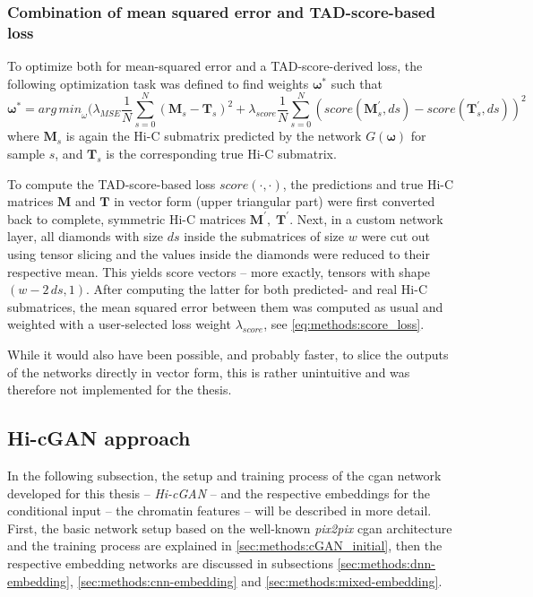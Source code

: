 \subsubsection{Combination of mean squared error and TAD-score-based loss} \label{sec:methods:score_loss}
To optimize both for mean-squared error and a TAD-score-derived loss, the following optimization task was defined to find weights $\bm{\omega}^*$ such that
\begin{equation}
 \bm{\omega}^* = \mathit{arg\,min}_\omega (  \lambda_\mathit{MSE} \frac{1}{N} \sum_{s=0}^N (\mathbf{M}_s - \mathbf{T}_s)^2
                                                    + \lambda_\mathit{score} \frac{1}{N} \sum_{s=0}^N (\mathit{score}(\mathbf{M}^\prime_s,ds) - \mathit{score}(\mathbf{T}^\prime_s,ds))^2 \label{eq:methods:score_loss}
\end{equation}
where $\mathbf{M}_s$ is again the Hi-C submatrix predicted by the network $G(\bm{\omega})$ for sample $s$, and $\mathbf{T}_s$ is the corresponding true Hi-C submatrix.

To compute the TAD-score-based loss $\mathit{score}(\cdot,\cdot)$, the predictions and true Hi-C matrices $\mathbf{M}$ and $\mathbf{T}$ in vector form (upper triangular part)
were first converted back to complete, symmetric Hi-C matrices $\mathbf{M}^\prime,\; \mathbf{T}^\prime$. 
Next, in a custom network layer, all diamonds with size $ds$ inside the submatrices of size $w$ were cut out using tensor slicing and the values inside the diamonds were reduced to their respective mean.
This yields score vectors -- more exactly, tensors with shape $(w - 2\,ds, 1)$.
After computing the latter for both predicted- and real Hi-C submatrices, the mean squared error between them was computed as usual and weighted with 
a user-selected loss weight $\lambda_\mathit{score}$, see \cref{eq:methods:score_loss}.

While it would also have been possible, and probably faster, to slice the outputs of the networks directly in vector form, 
this is rather unintuitive and was therefore not implemented for the thesis. 

\subsection{Hi-cGAN approach} \label{sec:methods:hicgan}
In the following subsection, the setup and training process of the \acrshort{cgan} network developed for this thesis -- \emph{Hi-cGAN} -- and the respective
embeddings for the conditional input -- the chromatin features -- will be described in more detail.
First, the basic network setup based on the well-known \emph{pix2pix} \acrshort{cgan} architecture \cite{Isola2017} and the training process
are explained in \cref{sec:methods:cGAN_initial}, then the respective embedding networks are discussed in subsections \ref{sec:methods:dnn-embedding},
\ref{sec:methods:cnn-embedding} and \ref{sec:methods:mixed-embedding}.

